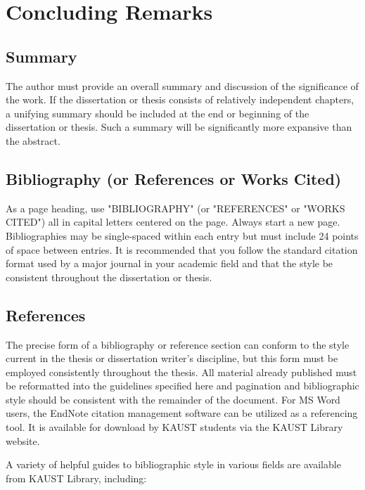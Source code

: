 

\chapter{Concluding Remarks}

\section{Summary}

The author must provide an overall summary and discussion of the significance of the work. If the dissertation or thesis consists of relatively independent chapters, a unifying summary should be included at the end or beginning of the dissertation or thesis. Such a summary will be significantly more expansive than the abstract.

\section{Bibliography (or References or Works Cited)}

As a page heading, use "BIBLIOGRAPHY" (or "REFERENCES" or "WORKS CITED") all in capital letters centered on the page. Always start a new page. Bibliographies may be single-spaced within each entry but must include 24 points of space between entries. It is recommended that you follow the standard citation format used by a major journal in your academic field and that the style be consistent throughout the dissertation or thesis.

\section{References}

The precise form of a bibliography or reference section can conform to the style current in the thesis or dissertation writer's discipline, but this form must be employed consistently throughout the thesis. All material already published must be reformatted into the guidelines specified here and pagination and bibliographic style should be consistent with the remainder of the document. For MS Word users, the EndNote citation management software can be utilized as a referencing tool. It is available for download by KAUST students via the KAUST Library website.  

A variety of helpful guides to bibliographic style in various fields are available from KAUST Library, including:

